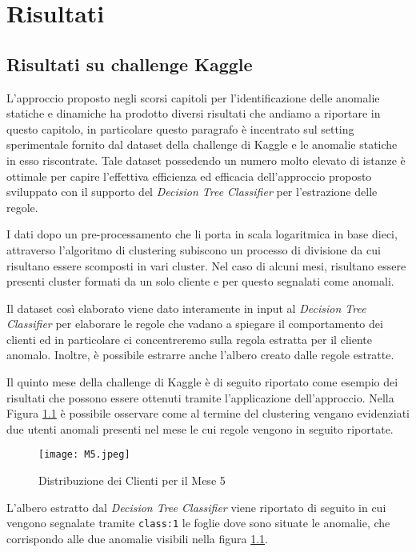 \chapter{Risultati}
\section{Risultati su challenge Kaggle}
L'approccio proposto negli scorsi capitoli per l'identificazione delle anomalie statiche e dinamiche ha prodotto diversi risultati che andiamo a riportare in questo capitolo, in particolare questo paragrafo è incentrato sul setting sperimentale fornito dal dataset della challenge di Kaggle e le anomalie statiche in esso riscontrate.  
\noindent Tale dataset possedendo un numero molto elevato di istanze è ottimale per capire l'effettiva efficienza ed efficacia dell'approccio proposto sviluppato con il supporto del \textit{Decision Tree Classifier} per l'estrazione delle regole.

I dati dopo un pre-processamento che li porta in scala logaritmica in base dieci, attraverso l'algoritmo di clustering subiscono un processo di divisione da cui risultano essere scomposti in vari cluster. Nel caso di alcuni mesi, risultano essere presenti cluster formati da un solo cliente e per questo segnalati come anomali.

Il dataset così elaborato viene dato interamente in input al \textit{Decision Tree Classifier} per elaborare le regole che vadano a spiegare il comportamento dei clienti ed in particolare ci concentreremo sulla regola estratta per il cliente anomalo. Inoltre, è possibile estrarre anche l'albero creato dalle regole estratte. 

Il quinto mese della challenge di Kaggle è di seguito riportato come esempio dei risultati che possono essere ottenuti tramite l'applicazione dell'approccio. Nella Figura \ref{fig:kaggle} è possibile osservare come al termine del clustering vengano evidenziati due utenti anomali presenti nel mese le cui regole vengono in seguito riportate.

\begin{figure}[H]
    \texttt{[image: M5.jpeg]}
    \centering
    \caption{Distribuzione dei Clienti per il Mese 5}
    \label{fig:kaggle}
\end{figure}

\noindent L'albero estratto dal \textit{Decision Tree Classifier} viene riportato di seguito in cui vengono segnalate tramite \verb{class:1{ le foglie dove sono situate le anomalie, che corrispondo alle due anomalie visibili nella figura \ref{fig:kaggle}. \\

